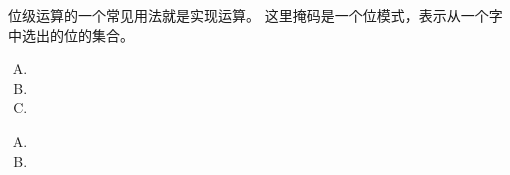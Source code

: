 {{        位级运算的一个常见用法就是实现运算。
        这里掩码是一个位模式，表示从一个字中选出的位的集合。

        \begin{practicec}
            \begin{enumerate}[A.]
                \item {}
                \item {}
                \item {}
            \end{enumerate}
        \end{practicec}

        \begin{practicec}
            \begin{enumerate}[A.]
                \item {}
                \item {}
            \end{enumerate}
        \end{practicec}
    }
}
